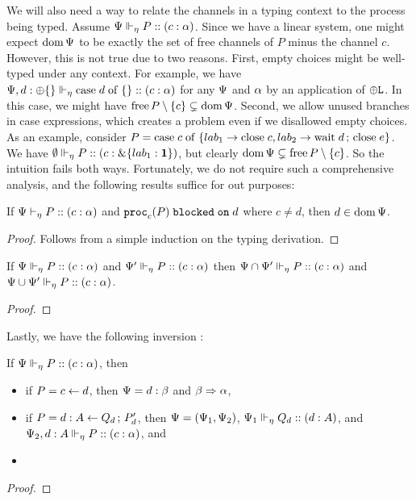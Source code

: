 We will also need a way to relate the channels in a typing context to the process being typed. Assume $\typeRecAJ P c \typeList$. Since we have a linear system, one might expect $\dom \ctx$ to be exactly the set of free channels of $P$ minus the channel $c$. However, this is not true due to two reasons. First, empty choices might be well-typed under any context. For example, we have $\typeRecAJR {\ctx, d : \internal \braces {}} {\tcase d {\braces {}}} c \typeList$ for any $\ctx$ and $\typeList$ by an application of $\internal\Left$. In this case, we might have $\free P \setminus \set{c} \subsetneq \dom \ctx$. Second, we allow unused branches in case expressions, which creates a problem even if we disallowed empty choices. As an example, consider
$P = \tcase c {\set{ \tbranch {\lab_1} {\tclose c}, \tbranch {\lab_2} {\twait d {\tclose e}} }}$.
We have $\typeRecAJR \emptyCtx P c {\externalSing {\lab_1} \terminate}$, but clearly $\dom \ctx \subsetneq \free P \setminus \set{c}$. So the intuition fails both ways. Fortunately, we do not require such a comprehensive analysis, and the following results suffice for out purposes:

\begin{lemma}
  \label{algorithmic:channel-in-context}
If $\typeRecDJ P c \typeList$ and $\blockedOn {\proc c P} d$ where $c \neq d$, then $d \in \dom\ctx$.
\end{lemma}
\begin{proof}
  Follows from a simple induction on the typing derivation.
\end{proof}

\begin{lemma}
  If $\typeRecAJ P c \typeList$ and $\typeRecAJR {\ctx'} P c \typeList$ then $\typeRecAJR {\ctx \cap \ctx'} P c \typeList$ and $\typeRecAJR {\ctx \cup \ctx'} P c \typeList$.
\end{lemma}
\begin{proof}
\end{proof}


Lastly, we have the following inversion :
\begin{lemma}
  \label{algorithmic:restricted-process-inversion}
  If $\typeRecAJ P c \typeList$, then
  \begin{itemize}
    \item if $P = \tfwd c d$, then $\ctx = d : \typeListB$ and $\typeListB \subA \typeList$,
    \item if $P = \tspawnType d {Q_d} A {P'_d}$, then $\ctx = \parens{\ctx_1, \ctx_2}$, $\typeRecAJR {\ctx_1} {Q_d} d A$, and $\typeRecAJR {\ctx_2, d : A} P c \typeList$, and
    \item {}
  \end{itemize}
\end{lemma}
\begin{proof}
\end{proof}

